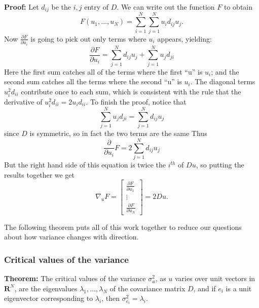 \documentclass[
]{article}
\begin{document}
\textbf{Proof:} Let \(d_{ij}\) be the \(i,j\) entry of \(D\). We can
write out the function \(F\) to obtain \[
F(u_1,\ldots, u_{N}) = \sum_{i=1}^{N} \sum_{j=1}^{N} u_i d_{ij} u_j.
\] Now \(\frac{\partial F}{\partial u_{i}}\) is going to pick out only
terms where \(u_{i}\) appears, yielding: \[
\frac{\partial F}{\partial u_{i}} = \sum_{j=1}^{N} d_{ij}u_{j} + \sum_{j=1}^{N} u_{j}d_{ji}
\] Here the first sum catches all of the terms where the first ``u'' is
\(u_{i}\); and the second sum catches all the terms where the second
``u'' is \(u_{i}\). The diagonal terms \(u_{i}^2d_{ii}\) contribute once
to each sum, which is consistent with the rule that the derivative of
\(u_{i}^2d_{ii} = 2u_{i}d_{ii}\). To finish the proof, notice that \[
\sum_{j=1}^{N} u_{j}d_{ji} = \sum_{j=1}^{N} d_{ij}u_{j} 
\] since \(D\) is symmetric, so in fact the two terms are the same Thus
\[
\frac{\partial}{\partial u_{i}}F = 2\sum_{j=1}^{N} d_{ij}u_{j}
\] But the right hand side of this equation is twice the \(i^{th}\) of
\(Du\), so putting the results together we get \[
\nabla_{u}F = \left[\begin{matrix} \frac{\partial F}{\partial u_{1}} \\ \vdots \\ \frac{\partial F}{\partial u_{N}}\end{matrix}\right] = 2Du.
\]

The following theorem puts all of this work together to reduce our
questions about how variance changes with direction.

\hypertarget{sec:critvals}{%
\subsubsection{Critical values of the variance}\label{sec:critvals}}

\textbf{Theorem:} The critical values of the variance \(\sigma_{u}^2\),
as \(u\) varies over unit vectors in \(\mathbf{R}^{N}\), are the
eigenvalues \(\lambda_{1},\ldots,\lambda_{N}\) of the covariance matrix
\(D\), and if \(e_{i}\) is a unit eigenvector corresponding to
\(\lambda_{i}\), then \(\sigma_{e_{i}}^2 = \lambda_{i}\).
\end{document}
